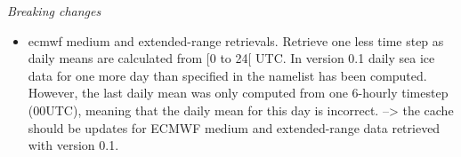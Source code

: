 \documentclass[DIV=10, parskip=full]{scrreprt}
\begin{document}
\textit{Breaking changes}
\begin{itemize}
	\item ecmwf medium and extended-range retrievals. Retrieve one less time step as daily means are calculated from [0 to 24[ UTC. In version 0.1 daily sea ice data for one more day than specified in the namelist has been computed. However, the last daily mean was only computed from one 6-hourly timestep (00UTC), meaning that the daily mean for this day is incorrect. --> the cache should be updates for ECMWF medium and extended-range data retrieved with version 0.1.
\end{itemize}



\clearpage
{}


\end{document}

